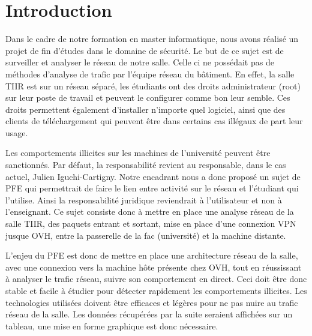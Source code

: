 \chapter*{Introduction}
\label{chap:introduction}

Dans le cadre de notre formation en master informatique, nous avons réalisé un projet de fin d'études dans le domaine de sécurité. Le but de ce sujet est de surveiller et analyser le réseau de notre salle. Celle ci ne possédait pas de méthodes d'analyse de trafic par l'équipe réseau du bâtiment. En effet, la salle TIIR est sur un réseau séparé, les étudiants ont des droits administrateur (root) sur leur poste de travail et peuvent le configurer comme bon leur semble. Ces droits permettent également d'installer n'importe quel logiciel, ainsi que des clients de téléchargement qui peuvent être dans certains cas illégaux de part leur usage.

Les comportements illicites sur les machines de l'université peuvent être sanctionnés. Par défaut, la responsabilité revient au responsable, dans le cas actuel, Julien Iguchi-Cartigny. Notre encadrant nous a donc proposé un sujet de PFE qui permettrait de faire le lien entre activité sur le réseau et l'étudiant qui l'utilise. Ainsi la responsabilité juridique reviendrait à l'utilisateur et non à l'enseignant. Ce sujet consiste donc à mettre en place une analyse réseau de la salle TIIR, des paquets entrant et sortant, mise en place d'une connexion VPN jusque OVH, entre la passerelle de la fac (université) et la machine distante.

L'enjeu du PFE est donc de mettre en place une architecture réseau de la salle, avec une connexion vers la machine hôte présente chez OVH, tout en réussissant à analyser le trafic réseau, suivre son comportement en direct. Ceci doit être donc stable et facile à étudier pour détecter rapidement les comportements illicites. Les technologies utilisées doivent être efficaces et légères pour ne pas nuire au trafic réseau de la salle. Les données récupérées par la suite seraient affichées sur un tableau, une mise en forme graphique est donc nécessaire.


